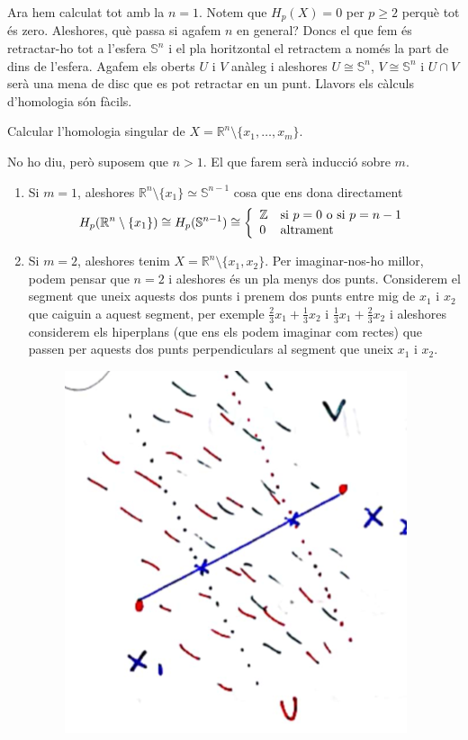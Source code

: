\documentclass[../main.tex]{subfiles}
\begin{document}
\begin{sol}
Ara hem calculat tot amb la $n=1$. Notem que $H_p(X)= 0$ per $p\geq 2$ perquè tot és zero. Aleshores, què passa si agafem $n$ en general? Doncs el que fem és retractar-ho tot a l'esfera $\mathbb{S}^n$ i el pla horitzontal el retractem a només la part de dins de l'esfera. Agafem els oberts $U$ i $V$ anàleg i aleshores $U\cong\mathbb{S}^n$, $V\cong\mathbb{S}^n$ i $U\cap V$ serà una mena de disc que es pot retractar en un punt. Llavors els càlculs d'homologia són fàcils.
\end{sol}

\begin{exercici}
Calcular l'homologia singular de $X = \mathbb{R}^n\setminus\{x_1,\ldots,x_m\}$.
\end{exercici}
\begin{sol}
No ho diu, però suposem que $n>1$. El que farem serà inducció sobre $m$.
\begin{enumerate}
    \item Si $m = 1$, aleshores $\mathbb{R}^n\setminus\{x_1\}\simeq \mathbb{S}^{n-1}$ cosa que ens dona directament
    \begin{equation}
        \notag
        H_p(\mathbb{R}^n\setminus\{x_1\}) \cong H_p(\mathbb{S}^{n-1})\cong\left\{
        \begin{array}{ll}
            \mathbb{Z} & \text{si $p = 0$ o si $p = n-1$} \\
            0 & \text{altrament}
        \end{array}
        \right.
    \end{equation}
    \item Si $m = 2$, aleshores tenim $X = \mathbb{R}^n\setminus\{x_1,x_2\}$. Per imaginar-nos-ho millor, podem pensar que $n = 2$ i aleshores és un pla menys dos punts. Considerem el segment que uneix aquests dos punts i prenem dos punts entre mig de $x_1$ i $x_2$ que caiguin a aquest segment, per exemple $\frac{2}{3}x_1+\frac{1}{3}x_2$ i $\frac{1}{3}x_1+\frac{2}{3}x_2$ i aleshores considerem els hiperplans (que ens els podem imaginar com rectes) que passen per aquests dos punts perpendiculars al segment que uneix $x_1$ i $x_2$.
    \begin{figure}
        \centering
        \includegraphics[scale = 0.5]{pictures/exercicimv.png}

\end{figure}
\end{enumerate}
\end{sol}
\end{document}

